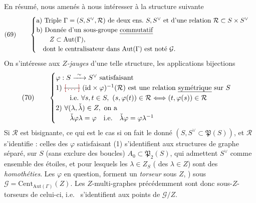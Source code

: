 \documentclass[11pt,a4paper]{article}
\begin{document}
En résumé, nous \struck{\ill{}} amenés à nous intéresser à la structure
suivante
\[
(69)\qquad
\begin{cases}
\text{a) Triple } \Gamma = (S, S^{\vee}, \mathcal{R}) \text{ de deux ens.\ } S, S^{\vee} \text{ et d'une relation } \mathcal{R} \subset S \times S^{\vee} \\
\text{b) Donnée d'un sous-groupe \emph{commutatif}} \\
\qquad Z \subset \mathrm{Aut}(\Gamma), \\
\quad \text{dont le centralisateur dans } \mathrm{Aut}(\Gamma) \text{ est noté } \mathcal{G}.
\end{cases}
\]
On s'intéresse aux \emph{$Z$-jauges} d'une telle structure, les applications
bijections
\[
(70)\qquad
\begin{cases}
\varphi : S \xrightarrow{\ \sim\ } S^{\vee} \text{ satisfaisant} \\
\text{1) } \text{\struck{\ill{}}}\ (\mathrm{id} \times \varphi)^{-1}(\mathcal{R}) \text{ est une relation \emph{symétrique} sur } S \\
\qquad \text{i.e.\ } \forall s, t \in S,\ (s, \varphi(t)) \in \mathcal{R} \Longleftrightarrow (t, \varphi(s)) \in \mathcal{R} \\
\text{2) } \forall (\lambda, \check{\lambda}) \in Z, \text{ on a} \\
\qquad \check{\lambda} \varphi \lambda = \varphi \quad \text{i.e.} \quad \check{\lambda} \varphi = \varphi \lambda^{-1}
\end{cases}
\]
Si $\mathcal{R}$ est bisignante, ce qui est le cas si on fait le donné
$(S, S^{\vee} \subset \mathfrak{P}(S))$, et $\mathcal{R}$ s'identifie : celles
des $\varphi$ satisfaisant (1) s'identifient aux structures de graphe
 \struck{\ill{}} séparé, sur $S$ (sans exclure des boucles)
$A_0 \subset \mathfrak{P}_2(S)$, qui admettent $S^{\vee}$ comme ensemble des
étoiles, et pour lesquels les $\lambda \in Z_S$ ( des
$\lambda \in Z$) sont des \emph{homothéties}. Les
 $\varphi$ en question,
forment un \emph{torseur}  sous $Z$, ) sous
$\mathcal{G} = \mathrm{Cent}_{\mathrm{Aut}(\Gamma)}(Z)$. Les $Z$-multi-graphes
 précédemment sont donc 
sous-$Z$-torseurs de celui-ci, i.e.\ \struck{\ill{}} s'identifient aux points
de $\mathcal{G}/Z$.
\end{document}
